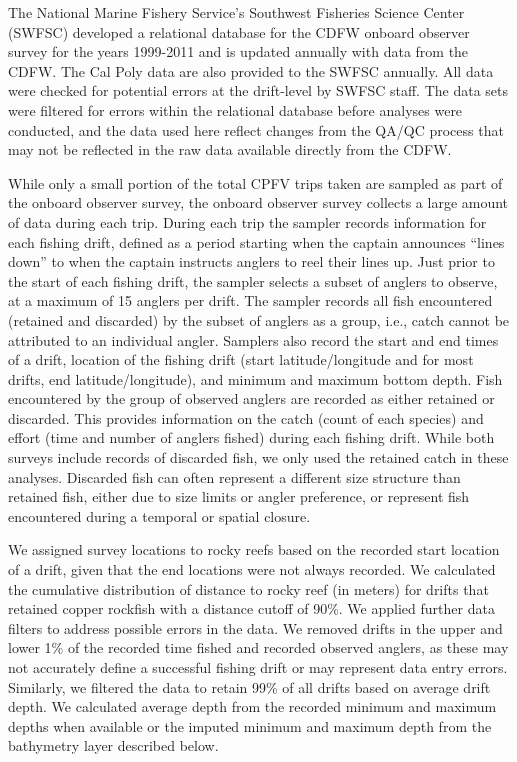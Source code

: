 \documentclass[
  12pt,
  authoryear,
  preprint,
  3p]{elsarticle}
\begin{document}
The National Marine Fishery Service's Southwest Fisheries Science Center
(SWFSC) developed a relational database for the CDFW onboard observer
survey \citeyearpar{Monk:2014:DRD} for the years 1999-2011 and is
updated annually with data from the CDFW. The Cal Poly data are also
provided to the SWFSC annually. All data were checked for potential
errors at the drift-level by SWFSC staff. The data sets were filtered
for errors within the relational database before analyses were
conducted, and the data used here reflect changes from the QA/QC process
that may not be reflected in the raw data available directly from the
CDFW.

While only a small portion of the total CPFV trips taken are sampled as
part of the onboard observer survey, the onboard observer survey
collects a large amount of data during each trip. During each trip the
sampler records information for each fishing drift, defined as a period
starting when the captain announces ``lines down'' to when the captain
instructs anglers to reel their lines up. Just prior to the start of
each fishing drift, the sampler selects a subset of anglers to observe,
at a maximum of 15 anglers per drift. The sampler records all fish
encountered (retained and discarded) by the subset of anglers as a
group, i.e., catch cannot be attributed to an individual angler.
Samplers also record the start and end times of a drift, location of the
fishing drift (start latitude/longitude and for most drifts, end
latitude/longitude), and minimum and maximum bottom depth. Fish
encountered by the group of observed anglers are recorded as either
retained or discarded. This provides information on the catch (count of
each species) and effort (time and number of anglers fished) during each
fishing drift. While both surveys include records of discarded fish, we
only used the retained catch in these analyses. Discarded fish can often
represent a different size structure than retained fish, either due to
size limits or angler preference, or represent fish encountered during a
temporal or spatial closure.

We assigned survey locations to rocky reefs based on the recorded start
location of a drift, given that the end locations were not always
recorded. We calculated the cumulative distribution of distance to rocky
reef (in meters) for drifts that retained copper rockfish with a
distance cutoff of 90\%. We applied further data filters to address
possible errors in the data. We removed drifts in the upper and lower
1\% of the recorded time fished and recorded observed anglers, as these
may not accurately define a successful fishing drift or may represent
data entry errors. Similarly, we filtered the data to retain 99\% of all
drifts based on average drift depth. We calculated average depth from
the recorded minimum and maximum depths when available or the imputed
minimum and maximum depth from the bathymetry layer described below.
\end{document}
